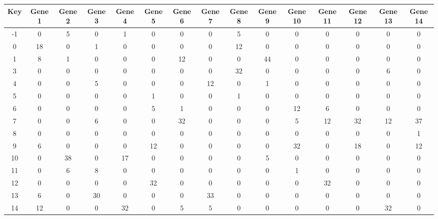 \begin{tabular}{|c|c|c|c|c|c|c|c|c|c|c|c|c|c|c|}
\hline
Key & Gene 1 & Gene 2 & Gene 3 & Gene 4 & Gene 5 & Gene 6 & Gene 7 & Gene 8 & Gene 9 & Gene 10 & Gene 11 & Gene 12 & Gene 13 & Gene 14 \\
\hline
-1 & 0 & 5 & 0 & 1 & 0 & 0 & 0 & 5 & 0 & 0 & 0 & 0 & 0 & 0 \\
0 & 18 & 0 & 1 & 0 & 0 & 0 & 0 & 12 & 0 & 0 & 0 & 0 & 0 & 0 \\
1 & 8 & 1 & 0 & 0 & 0 & 12 & 0 & 0 & 44 & 0 & 0 & 0 & 0 & 0 \\
3 & 0 & 0 & 0 & 0 & 0 & 0 & 0 & 32 & 0 & 0 & 0 & 0 & 6 & 0 \\
4 & 0 & 0 & 5 & 0 & 0 & 0 & 12 & 0 & 1 & 0 & 0 & 0 & 0 & 0 \\
5 & 0 & 0 & 0 & 0 & 1 & 0 & 0 & 1 & 0 & 0 & 0 & 0 & 0 & 0 \\
6 & 0 & 0 & 0 & 0 & 5 & 1 & 0 & 0 & 0 & 12 & 6 & 0 & 0 & 0 \\
7 & 0 & 0 & 6 & 0 & 0 & 32 & 0 & 0 & 0 & 5 & 12 & 32 & 12 & 37 \\
8 & 0 & 0 & 0 & 0 & 0 & 0 & 0 & 0 & 0 & 0 & 0 & 0 & 0 & 1 \\
9 & 6 & 0 & 0 & 0 & 12 & 0 & 0 & 0 & 0 & 32 & 0 & 18 & 0 & 12 \\
10 & 0 & 38 & 0 & 17 & 0 & 0 & 0 & 0 & 5 & 0 & 0 & 0 & 0 & 0 \\
11 & 0 & 6 & 8 & 0 & 0 & 0 & 0 & 0 & 0 & 1 & 0 & 0 & 0 & 0 \\
12 & 0 & 0 & 0 & 0 & 32 & 0 & 0 & 0 & 0 & 0 & 32 & 0 & 0 & 0 \\
13 & 6 & 0 & 30 & 0 & 0 & 0 & 33 & 0 & 0 & 0 & 0 & 0 & 0 & 0 \\
14 & 12 & 0 & 0 & 32 & 0 & 5 & 5 & 0 & 0 & 0 & 0 & 0 & 32 & 0 \\
\hline
\end{tabular}
